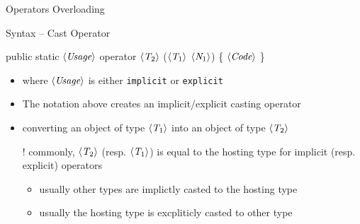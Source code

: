 \documentclass[presentation]{beamer}
\newcommand{\cscat}[1]{$\langle\text{{\itshape#1}}\rangle$}
\begin{document}
\begin{frame}[allowframebreaks]{Operators Overloading}
  \begin{block}{Syntax -- Cast Operator}
    \begin{center}\ttfamily
      public static \cscat{Usage}  \alert{operator} \cscat{T$_2$} \alert{(}\cscat{T$_1$} \cscat{N$_1$}\alert{)} \{ \cscat{Code} \}
    \end{center}
    \begin{itemize}
      \item where \texttt{\cscat{Usage}} is either \alert{\texttt{implicit}} or \alert{\texttt{explicit}}
      \item The notation above creates an implicit/explicit casting operator 
      \item converting an object of type \texttt{\cscat{T$_1$}} into an object of type \texttt{\cscat{T$_2$}}
      \item[!] commonly, \texttt{\cscat{T$_2$}} (resp. \texttt{\cscat{T$_1$}}) is equal to the hosting type for implicit (resp. explicit) operators
      \begin{itemize}
        \item usually other types are \alert{implictly} casted to the hosting type
        \item usually the hosting type is \alert{excpliticly} casted to other type
      \end{itemize} 
    \end{itemize}
  \end{block}
\end{frame}
\end{document}
